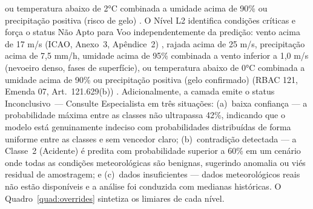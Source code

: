 \documentclass[english,brazilian]{UNISINOSartigo}
\begin{document}
ou temperatura abaixo de 2°C combinada a umidade acima de 90\% ou precipitação positiva
(risco de gelo) \cite{BRANDAO2016}. O
Nível L2 identifica condições críticas e força o status Não Apto para Voo
independentemente da predição: vento acima de 17 m/s (ICAO, Anexo~3, Apêndice~2) \cite{ICAO2018},
rajada acima de 25 m/s,
precipitação acima de 7,5 mm/h,
umidade acima de 95\% combinada a vento inferior a 1,0 m/s (nevoeiro denso, fases de superfície),
ou temperatura abaixo de 0°C combinada a umidade acima de 90\% ou precipitação positiva
(gelo confirmado) (RBAC 121, Emenda 07, Art.~121.629(b)) \cite{RBAC121}.
Adicionalmente, a camada emite o status Inconclusivo~--- Consulte Especialista
em três situações: (a)~baixa confiança --- a probabilidade máxima entre
as classes não ultrapassa 42\%, indicando que o modelo está genuinamente indeciso
com probabilidades distribuídas de forma uniforme entre as classes e sem vencedor
claro; (b)~contradição detectada --- a Classe~2 (Acidente) é predita com
probabilidade superior a 60\% em um cenário onde todas as condições meteorológicas
são benignas, sugerindo anomalia ou viés residual de amostragem; e (c)~dados
insuficientes --- dados meteorológicos reais não estão disponíveis e a análise
foi conduzida com medianas históricas. O
Quadro~\ref{quad:overrides} sintetiza os limiares de cada nível.
\end{document}
